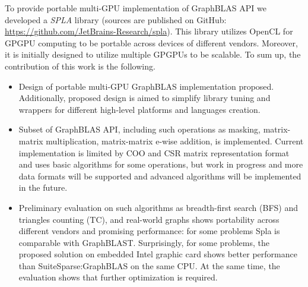 To provide portable multi-GPU implementation of GraphBLAS API we developed a \textit{SPLA} library (sources are published on GitHub: \url{https://github.com/JetBrains-Research/spla}).
This library utilizes OpenCL for GPGPU computing to be portable across devices of different vendors.
Moreover, it is initially designed to utilize multiple GPGPUs to be scalable.
To sum up, the contribution of this work is the following.
\begin{itemize}
    \item Design of portable multi-GPU GraphBLAS implementation proposed. Additionally, proposed design is aimed to simplify library tuning and wrappers for different high-level platforms and languages creation. 
    \item Subset of GraphBLAS API, including such operations as masking, matrix-matrix multiplication, matrix-matrix e-wise addition, is implemented. Current implementation is limited by COO and CSR matrix representation format and uses basic algorithms for some operations, but work in progress and more data formats will be supported and advanced algorithms will be implemented in the future.
    \item Preliminary evaluation on such algorithms as breadth-first search (BFS) and triangles counting (TC), and real-world graphs shows portability across different vendors and promising performance: for some problems Spla is comparable with GraphBLAST. Surprisingly, for some problems, the proposed solution on embedded Intel graphic card shows better performance than SuiteSparse:GraphBLAS on the same CPU. At the same time, the evaluation shows that further optimization is required.
\end{itemize} 